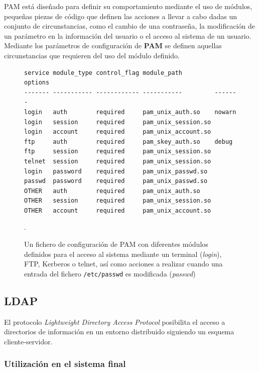 PAM está diseñado para definir su comportamiento mediante el uso de módulos, pequeñas piezas de código que definen las acciones a llevar a cabo dadas un conjunto de circunstancias, como el cambio de una contraseña, la modificación de un parámetro en la información del usuario o el acceso al sistema de un usuario. Mediante los parámetros de configuración de \textbf{PAM} se definen aquellas circunstancias que requieren del uso del módulo definido.

\begin{figure}[H]
\centering
\begin{lstlisting}
service module_type control_flag module_path         options
------- ----------- ------------ -----------         -------
login   auth        required     pam_unix_auth.so    nowarn
login   session     required     pam_unix_session.so
login   account     required     pam_unix_account.so
ftp     auth        required     pam_skey_auth.so    debug
ftp     session     required     pam_unix_session.so
telnet  session     required     pam_unix_session.so
login   password    required     pam_unix_passwd.so
passwd  password    required     pam_unix_passwd.so
OTHER   auth        required     pam_unix_auth.so
OTHER   session     required     pam_unix_session.so
OTHER   account     required     pam_unix_account.so
\end{lstlisting}

\caption[Fichero de configuración de PAM]{Un fichero de configuración de PAM con diferentes módulos definidos para el acceso al sistema mediante un terminal (\textit{login}), FTP, Kerberos o telnet, así como acciones a realizar cuando una entrada del fichero \texttt{/etc/passwd} es modificada (\textit{passwd})}.
\end{figure}

\subsection{LDAP}
\label{teoria:ldap}

El protocolo \textit{Lightweight Directory Access Protocol} posibilita el acceso a directorios de información en un entorno distribuido siguiendo un esquema cliente-servidor.


\subsubsection{Utilización en el sistema final}

